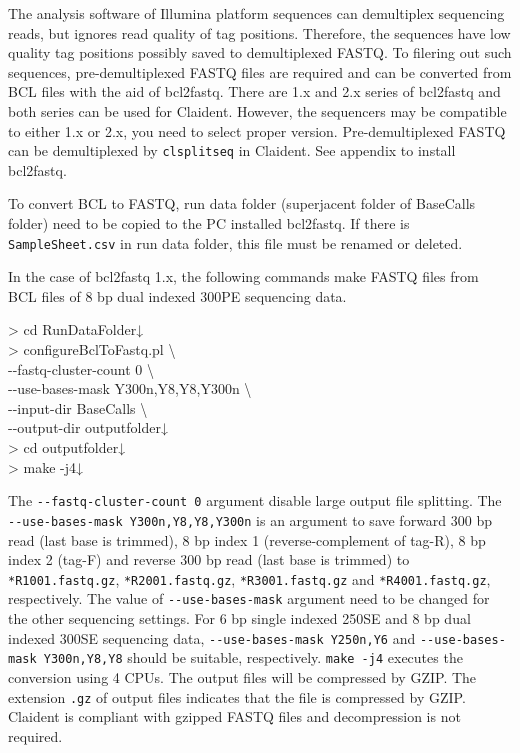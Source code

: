 \documentclass[titlepage,10pt,a4paper,english]{jsbook}
\newenvironment{cmd}{\begin{oframed}\raggedright\ttfamily\footnotesize\setlength{\baselineskip}{1.4em}}{\end{oframed}\vspace{-1em}}
\begin{document}
The analysis software of Illumina platform sequences can demultiplex sequencing reads, but ignores read quality of tag positions.
Therefore, the sequences have low quality tag positions possibly saved to demultiplexed FASTQ.
To filering out such sequences, pre-demultiplexed FASTQ files are required and can be converted from BCL files with the aid of bcl2fastq.
There are 1.x and 2.x series of bcl2fastq and both series can be used for Claident.
However, the sequencers may be compatible to either 1.x or 2.x, you need to select proper version.
Pre-demultiplexed FASTQ can be demultiplexed by \texttt{clsplitseq} in Claident.
See appendix to install bcl2fastq.

To convert BCL to FASTQ, run data folder (superjacent folder of BaseCalls folder) need to be copied to the PC installed bcl2fastq.
If there is \texttt{SampleSheet.csv} in run data folder, this file must be renamed or deleted.

In the case of bcl2fastq 1.x, the following commands make FASTQ files from BCL files of 8 bp dual indexed 300PE sequencing data.

\begin{cmd}
{\textgreater} cd RunDataFolder↓\\
{\textgreater} configureBclToFastq.pl {\textbackslash}\\
{-}{-}fastq-cluster-count 0 {\textbackslash}\\
{-}{-}use-bases-mask Y300n,Y8,Y8,Y300n {\textbackslash}\\
{-}{-}input-dir BaseCalls {\textbackslash}\\
{-}{-}output-dir outputfolder↓\\
{\textgreater} cd outputfolder↓\\
{\textgreater} make -j4↓
\end{cmd}

The \texttt{{-}{-}fastq-cluster-count 0} argument disable large output file splitting.
The \texttt{{-}{-}use-bases-mask Y300n,Y8,Y8,Y300n} is an argument to save forward 300 bp read (last base is trimmed), 8 bp index 1 (reverse-complement of tag-R), 8 bp index 2 (tag-F) and reverse 300 bp read (last base is trimmed) to \texttt{*{\textunderscore}R1{\textunderscore}001.fastq.gz}, \texttt{*{\textunderscore}R2{\textunderscore}001.fastq.gz}, \texttt{*{\textunderscore}R3{\textunderscore}001.fastq.gz} and \texttt{*{\textunderscore}R4{\textunderscore}001.fastq.gz}, respectively.
The value of \texttt{{-}{-}use-bases-mask} argument need to be changed for the other sequencing settings.
For 6 bp single indexed 250SE and 8 bp dual indexed 300SE sequencing data, \texttt{{-}{-}use-bases-mask Y250n,Y6} and \texttt{{-}{-}use-bases-mask Y300n,Y8,Y8} should be suitable, respectively.
\texttt{make -j4} executes the conversion using 4 CPUs.
The output files will be compressed by GZIP.
The extension \texttt{.gz} of output files indicates that the file is compressed by GZIP.
Claident is compliant with gzipped FASTQ files and decompression is not required.
\end{document}
